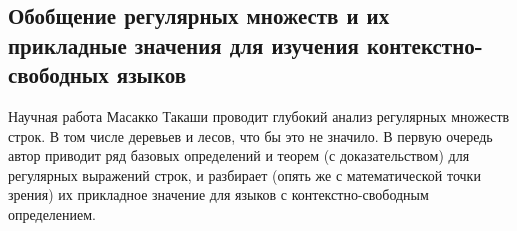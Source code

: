 \subsection{Обобщение регулярных множеств и их прикладные значения для изучения контекстно-свободных языков} \label{subsection_Takahashi1975}
Научная работа  \cite{Takahashi1975} Масакко Такаши проводит глубокий анализ регулярных множеств строк. В том числе деревьев и лесов, что бы это не значило. В первую очередь автор приводит ряд базовых определений и теорем (с доказательством) для регулярных выражений строк, и разбирает (опять же с математической точки зрения) их прикладное значение для языков с контекстно-свободным определением.


